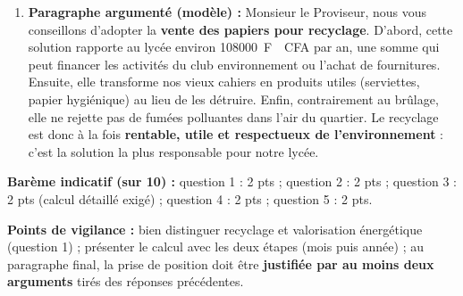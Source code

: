 \documentclass[11pt]{article}
\begin{document}
\begin{corrige}
\begin{enumerate}
\begin{center}
\begin{tabularx}{\linewidth}{|l|X|X|}
\hline
\end{tabularx}
\end{center}
\item \textbf{Paragraphe argumenté (modèle) :} Monsieur le Proviseur, nous vous conseillons d'adopter la \textbf{vente des papiers pour recyclage}. D'abord, cette solution rapporte au lycée environ \SI{108000}{F\!CFA} par an, une somme qui peut financer les activités du club environnement ou l'achat de fournitures. Ensuite, elle transforme nos vieux cahiers en produits utiles (serviettes, papier hygiénique) au lieu de les détruire. Enfin, contrairement au brûlage, elle ne rejette pas de fumées polluantes dans l'air du quartier. Le recyclage est donc à la fois \textbf{rentable, utile et respectueux de l'environnement} : c'est la solution la plus responsable pour notre lycée.
\end{enumerate}
\textbf{Barème indicatif (sur 10) :} question 1 : 2 pts ; question 2 : 2 pts ; question 3 : 2 pts (calcul détaillé exigé) ; question 4 : 2 pts ; question 5 : 2 pts.
\par\textbf{Points de vigilance :} bien distinguer recyclage et valorisation énergétique (question 1) ; présenter le calcul avec les deux étapes (mois puis année) ; au paragraphe final, la prise de position doit être \textbf{justifiée par au moins deux arguments} tirés des réponses précédentes.
\end{corrige}
\end{document}
